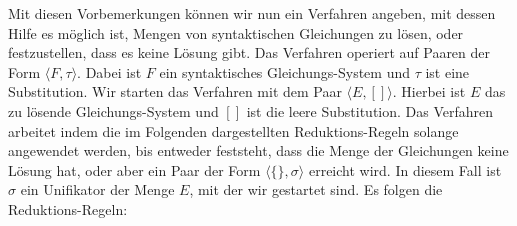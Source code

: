 Mit diesen Vorbemerkungen k\"{o}nnen wir nun ein Verfahren angeben, mit dessen Hilfe es
m\"{o}glich ist, Mengen von syntaktischen Gleichungen zu l\"{o}sen, oder festzustellen, dass es
keine L\"{o}sung gibt.  Das Verfahren operiert auf Paaren der Form 
$\langle F, \tau \rangle$.  Dabei ist $F$ ein syntaktisches Gleichungs-System und
$\tau$ ist eine Substitution.  Wir starten das Verfahren mit dem Paar 
$\langle E, [] \rangle$. Hierbei ist $E$ das zu l\"{o}sende Gleichungs-System und $[]$ ist die leere Substitution.
Das Verfahren arbeitet indem die im Folgenden
dargestellten Reduktions-Regeln solange angewendet werden, bis entweder feststeht, dass
die Menge der Gleichungen keine L\"{o}sung hat, oder aber ein Paar der Form 
$\langle \{\}, \sigma \rangle$ erreicht wird.  In diesem Fall ist $\sigma$ ein
Unifikator der Menge $E$, mit der wir gestartet sind.  Es folgen die Reduktions-Regeln:
